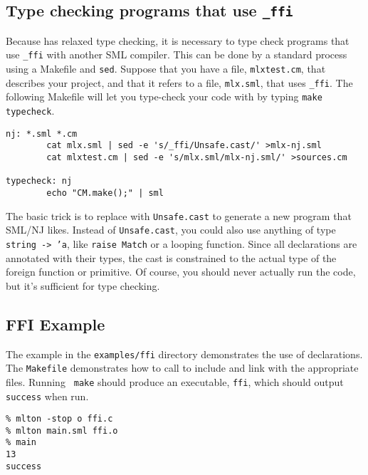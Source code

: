 \subsection{Type checking programs that use {\tt \_ffi}}

Because {\mlton} has relaxed type checking, it is necessary to
type check programs that use {\tt \_ffi} with another SML compiler.
This can be done by a standard process using a Makefile and {\tt sed}.
Suppose that you have a file, {\tt mlxtest.cm}, that describes your
{\mlton} project, and that it refers to a file, {\tt mlx.sml}, that
uses {\tt \_ffi}.  The following Makefile will let you type-check your
code with {\smlnj} by typing {\tt make typecheck}.

\begin{verbatim}
nj: *.sml *.cm
        cat mlx.sml | sed -e 's/_ffi/Unsafe.cast/' >mlx-nj.sml
        cat mlxtest.cm | sed -e 's/mlx.sml/mlx-nj.sml/' >sources.cm

typecheck: nj
        echo "CM.make();" | sml
\end{verbatim}

The basic trick is to replace {\ffi} with {\tt Unsafe.cast} to generate a new
program that SML/NJ likes.  Instead of {\tt Unsafe.cast}, you could also use
anything of type {\tt string -> 'a}, like {\tt raise Match} or a looping
function.  Since all {\ffi} declarations are annotated with their types, the
cast is constrained to the actual type of the foreign function or primitive. Of
course, you should never actually run the code, but it's sufficient for type
checking.

\subsection{FFI Example}

The example in the {\tt examples/ffi} directory demonstrates the use of
{\ffi} declarations.  The {\tt Makefile} demonstrates how
to call {\mlton} to include and link with the appropriate files.  Running {\tt
make} should produce an executable, {\tt ffi}, which should output {\tt success}
when run.

\begin{verbatim}
% mlton -stop o ffi.c
% mlton main.sml ffi.o
% main
13
success
\end{verbatim}
